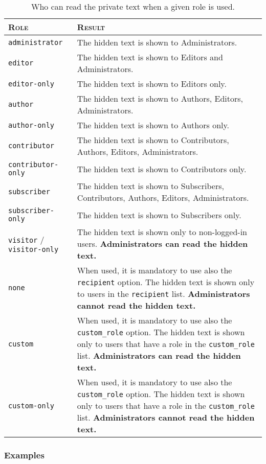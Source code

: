 \documentclass[a4paper,10pt]{article}
\begin{document}
\begin{table}
 \centering
 \begin{tabular}[t]{l p{7cm}}
 \toprule
 \textsc{Role} & \textsc{Result} \\
 \midrule
 \verb+administrator+ & The hidden text is shown to Administrators. \\
 \verb+editor+ & The hidden text is shown to Editors and Administrators. \\
 \verb+editor-only+ & The hidden text is shown to Editors only. \\
 \verb+author+ & The hidden text is shown to Authors, Editors, Administrators. \\
 \verb+author-only+ & The hidden text is shown to Authors only. \\
 \verb+contributor+ & The hidden text is shown to Contributors, Authors, Editors, Administrators. \\
 \verb+contributor-only+ & The hidden text is shown to Contributors only. \\
 \verb+subscriber+ & The hidden text is shown to Subscribers, Contributors, Authors, Editors, Administrators. \\
 \verb+subscriber-only+ & The hidden text is shown to Subscribers only. \\
 \verb+visitor+ / \verb+visitor-only+ & The hidden text is shown only to non-logged-in users. \textbf{Administrators can read the hidden text.} \\
 \verb+none+ & When used, it is mandatory to use also the \verb+recipient+ option. The hidden text is shown only to users in the \verb+recipient+ list. \textbf{Administrators cannot read the hidden text.} \\
 \verb+custom+ & When used, it is mandatory to use also the \verb+custom_role+ option. The hidden text is shown only to users that have a role in the \verb+custom_role+ list. \textbf{Administrators can read the hidden text.} \\
 \verb+custom-only+ & When used, it is mandatory to use also the \verb+custom_role+ option. The hidden text is shown only to users that have a role in the \verb+custom_role+ list. \textbf{Administrators cannot read the hidden text.} \\
 \bottomrule
 \end{tabular}
 \caption{Who can read the private text when a given role is used.}
 \label{table:roles}
\end{table}

\subsubsection{Examples}
\end{document}

